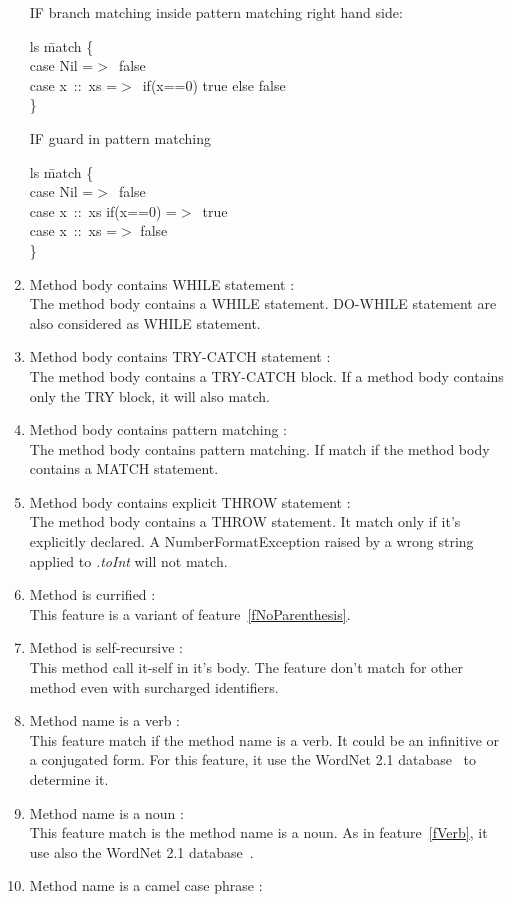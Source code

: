 \documentclass[12pt]{article}
\newcommand{\code}[1]{{\fontfamily{phv}\selectfont \small{\begin{tabbing} #1 \end{tabbing}}}}
\begin{document}
\begin{enumerate}
IF branch matching inside pattern matching right hand side:
\code{
ls \=match \{\\
\>case Nil =$>$\ false\\
\>case x\ ::\ xs =$>$\ if(x==0) true else false\\
\}
}
IF guard in pattern matching
\code{
ls \=match \{\\
\>case Nil =$>$\ false\\
\>case x\ ::\ xs if(x==0) =$>$\ true\\
\>case x\ ::\ xs =$>$ false\\
\}
}
\item Method body contains WHILE statement :\\
	The method body contains a WHILE statement. DO-WHILE statement are also considered as WHILE statement.
\item Method body contains TRY-CATCH statement :\\
	The method body contains a TRY-CATCH block. If a method body contains only the TRY block, it will also match.
\item Method body contains pattern matching : \\
	The method body contains pattern matching. If match if the method body contains a MATCH statement.
\item Method body contains explicit THROW statement :\\
	The method body contains a THROW statement. It match only if it's explicitly declared. A NumberFormatException raised by a wrong string applied to \textit{.toInt} will not match.
\item Method is currified : \\
	This feature is a variant of feature~\ref{fNoParenthesis}.
\item Method is self-recursive : \\
	This method call it-self in it's body. The feature don't match for other method even with surcharged identifiers.
\item Method name is a verb : \label{fVerb}\\
	This feature match if the method name is a verb. It could be an infinitive or a conjugated form. For this feature, it use the WordNet 2.1 database~\cite{wordNet} to determine it.
\item Method name is a noun :\\
	This feature match is the method name is a noun. As in feature~\ref{fVerb}, it use also the WordNet 2.1 database~\cite{wordNet}.
\item Method name is a camel case phrase : \label{fCamel}\\

\end{enumerate}
\end{document}
